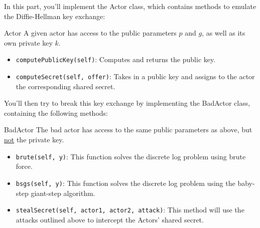 \documentclass{article}
\begin{document}
    \begin{tcolorbox}[enhanced,interior style={top color=Plum!20,bottom color=Plum!30}]
        In this part, you'll implement the Actor class, which contains methods to emulate the Diffie-Hellman key exchange:
    
        \begin{mybox}[
            colframe=Cerulean!50!black,
            colback=Cerulean!30,
            colbacktitle=Cerulean!,
            coltitle=Cerulean!30!black
            ]{Actor}
            A given actor has access to the public parameters $p$ and $g$, as well as its own private key $k$.
            \begin{itemize}
                \item \lstinline{computePublicKey(self)}: Computes and returns the public key.
                \item \lstinline{computeSecret(self, offer)}: Takes in a public key and assigns to the actor the corresponding shared secret.
            \end{itemize}
    
        \end{mybox}
    
        You'll then try to break this key exchange by implementing the BadActor class, containing the following methods:
    
        \begin{mybox}[
            colframe=purple!50!black,
            colback=purple!40,
            colbacktitle=purple!50!white,
            coltitle=purple!30!black,
            ]{BadActor}
            The bad actor has access to the same public parameters as above, but \underline{not} the private key.
            \begin{itemize}
                \item \lstinline{brute(self, y)}: This function solves the discrete log problem using brute force.
                \item \lstinline{bsgs(self, y)}: This function solves the discrete log problem using the baby-step giant-step algorithm.
                \item \lstinline{stealSecret(self, actor1, actor2, attack)}: This method will use the attacks outlined above to intercept the Actors' shared secret.
            \end{itemize}
        \end{mybox}
    

\end{tcolorbox}
\end{document}
